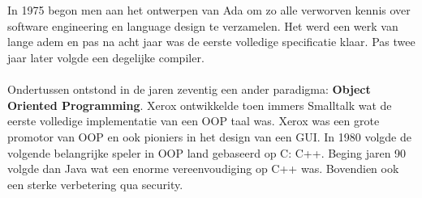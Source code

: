 \documentclass[../main.tex]{subfiles}
\begin{document}
\begin{solution}
\\\\
In 1975 begon men aan het ontwerpen van Ada om zo alle verworven kennis over software engineering en language design te verzamelen.
Het werd een werk van lange adem en pas na acht jaar was de eerste volledige specificatie klaar.
Pas twee jaar later volgde een degelijke compiler.
\\\\
Ondertussen ontstond in de jaren zeventig een ander paradigma: \textbf{Object Oriented Programming}.
Xerox ontwikkelde toen immers Smalltalk wat de eerste volledige implementatie van een OOP taal was.
Xerox was een grote promotor van OOP en ook  pioniers in het design van een GUI.
In 1980 volgde de volgende belangrijke speler in OOP land gebaseerd op C: C++.
Beging jaren 90 volgde dan Java wat een enorme vereenvoudiging op C++ was.
Bovendien ook een sterke verbetering qua security.
\end{solution}
\end{document}
